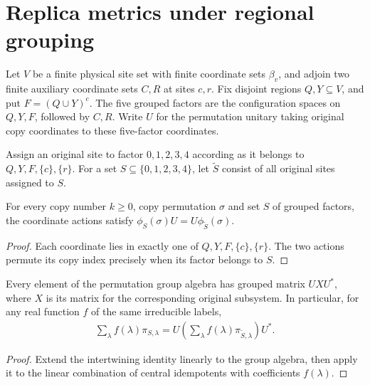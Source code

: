 \section{Replica metrics under regional grouping}

Let $V$ be a finite physical site set with finite coordinate sets $\beta_v$,
and adjoin two finite auxiliary coordinate sets $C,R$ at sites $c,r$.
Fix disjoint regions $Q,Y\subseteq V$, and put $F=(Q\cup Y)^c$.
The five grouped factors are the configuration spaces on $Q,Y,F$,
followed by $C,R$. Write $U$ for the permutation unitary taking
original copy coordinates to these five-factor coordinates.

\begin{definition}
  \label{def:regional_original_region}
  \leanok
  Assign an original site to factor $0,1,2,3,4$ according as it belongs
  to $Q,Y,F,\{c\},\{r\}$. For a set $S\subseteq\{0,1,2,3,4\}$,
  let $\widetilde S$ consist of all original sites assigned to $S$.
\end{definition}

\begin{theorem}
  \label{thm:regional_subsystem_permutation}
  \leanok
  For every copy number $k\geq0$, copy permutation $\sigma$ and set
  $S$ of grouped factors, the coordinate actions satisfy
  $\phi_S(\sigma)U=U\phi_{\widetilde S}(\sigma)$.
\end{theorem}
\begin{proof}\leanok
  Each coordinate lies in exactly one of $Q,Y,F,\{c\},\{r\}$.
  The two actions permute its copy index precisely when its factor
  belongs to $S$.
\end{proof}

\begin{theorem}
  \label{thm:regional_label_observable_coordinates}
  \leanok
  Every element of the permutation group algebra has grouped matrix
  $UXU^*$, where $X$ is its matrix for the corresponding original
  subsystem. In particular, for any real function $f$ of the same
  irreducible labels,
  \begin{align}
    \sum_\lambda f(\lambda)\pi_{S,\lambda}
      =U\left(\sum_\lambda f(\lambda)\pi_{\widetilde S,\lambda}\right)U^*.
  \end{align}
\end{theorem}
\begin{proof}\leanok
  Extend the intertwining identity linearly to the group algebra,
  then apply it to the linear combination of central idempotents
  with coefficients $f(\lambda)$.
\end{proof}

